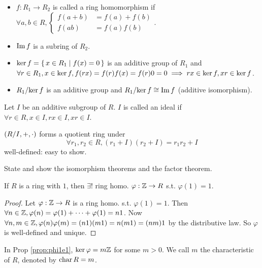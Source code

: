 \begin{definition} \mbox{}
  \begin{itemize}
    \item $f: R_1 \to R_2$ is called a ring homomorphism if
      $\forall a, b \in R, \begin{cases}
        f(a+b) &= f(a) + f(b) \\
        f(ab) &= f(a)f(b)
      \end{cases}$.
    \item $\operatorname{Im} f$ is a subring of $R_2$.
    \item $\operatorname{ker} f = \{\, x \in R_1 \mid f(x) = 0 \,\}$ is an additive group of
      $R_1$ and $\forall r \in R_1, x \in \operatorname{ker} f, f(rx) = f(r)f(x) = f(r)0 = 0
      \implies rx \in \operatorname{ker} f, xr \in \operatorname{ker} f$.
    \item ${R_1}/{\operatorname{ker} f}$ is an additive group and
      ${R_1}/{\operatorname{ker} f} \cong \operatorname{Im} f$ (additive isomorphism).
  \end{itemize}
\end{definition}

\begin{definition}
  Let $I$ be an additive subgroup of $R$.
  $I$ is called an ideal if $\forall r \in R, x \in I, rx \in I, xr \in I$.

  $\left({R}/{I}, +, \cdot \right)$ forms a quotient ring under
  \[ \forall r_1, r_2 \in R, (r_1+I)(r_2+I) = r_1r_2 + I \]
  well-defined: easy to show.
\end{definition}

\begin{exercise}
  State and show the isomorphism theorems and the factor theorem.
\end{exercise}

\begin{prop}
  If $R$ is a ring with $1$, then $\exists!$ ring homo. $\varphi: \mathbb{Z} \to R$
  s.t. $\varphi(1) = 1$.
  \begin{proof}
    Let $\varphi: \mathbb{Z} \to R$ is a ring homo. s.t. $\varphi(1) = 1$. Then
    $\forall n \in \mathbb{Z}, \varphi(n) = \varphi(1) + \dots + \varphi(1) = n1$.
    Now $\forall n, m \in \mathbb{Z}, \varphi(n)\varphi(m) = (n1)(m1) = n(m1) = (nm)1$
    by the distributive law. So $\varphi$ is well-defined and unique.
  \end{proof}
  \label{prop:phi1e1}
\end{prop}

\begin{definition}
  In Prop \ref{prop:phi1e1}, $\operatorname{ker} \varphi = m\mathbb{Z}$ for some $m > 0$.
  We call $m$ the characteristic of $R$, denoted by $\operatorname{char} R = m$.
\end{definition}

